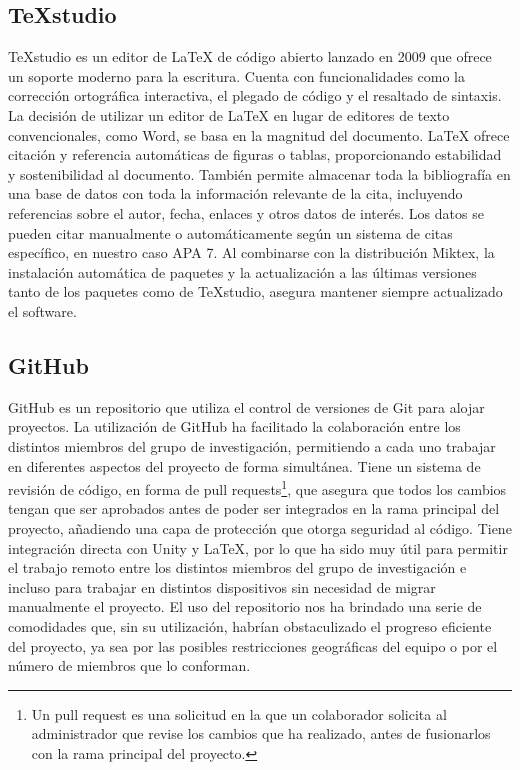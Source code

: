 \subsection{TeXstudio}

TeXstudio es un editor de LaTeX de código abierto lanzado en 2009 que ofrece un soporte moderno para la escritura. Cuenta con funcionalidades como la corrección ortográfica interactiva, el plegado de código y el resaltado de sintaxis. La decisión de utilizar un editor de LaTeX en lugar de editores de texto convencionales, como Word, se basa en la magnitud del documento. LaTeX ofrece citación y referencia automáticas de figuras o tablas, proporcionando estabilidad y sostenibilidad al documento. También permite almacenar toda la bibliografía en una base de datos con toda la información relevante de la cita, incluyendo referencias sobre el autor, fecha, enlaces y otros datos de interés. Los datos se pueden citar manualmente o automáticamente según un sistema de citas específico, en nuestro caso APA 7. Al combinarse con la distribución Miktex, la instalación automática de paquetes y la actualización a las últimas versiones tanto de los paquetes como de TeXstudio, asegura mantener siempre actualizado el software.

\subsection{GitHub}

GitHub es un repositorio que utiliza el control de versiones de Git para alojar proyectos. La utilización de GitHub ha facilitado la colaboración entre los distintos miembros del grupo de investigación, permitiendo a cada uno trabajar en diferentes aspectos del proyecto de forma simultánea. Tiene un sistema de revisión de código, en forma de pull requests\footnote{Un pull request es una solicitud en la que un colaborador solicita al administrador que revise los cambios que ha realizado, antes de fusionarlos con la rama principal del proyecto.}, que asegura que todos los cambios tengan que ser aprobados antes de poder ser integrados en la rama principal del proyecto, añadiendo una capa de protección que otorga seguridad al código. Tiene integración directa con Unity y LaTeX, por lo que ha sido muy útil para permitir el trabajo remoto entre los distintos miembros del grupo de investigación e incluso para trabajar en distintos dispositivos sin necesidad de migrar manualmente el proyecto. El uso del repositorio nos ha brindado una serie de comodidades que, sin su utilización, habrían obstaculizado el progreso eficiente del proyecto, ya sea por las posibles restricciones geográficas del equipo o por el número de miembros que lo conforman.